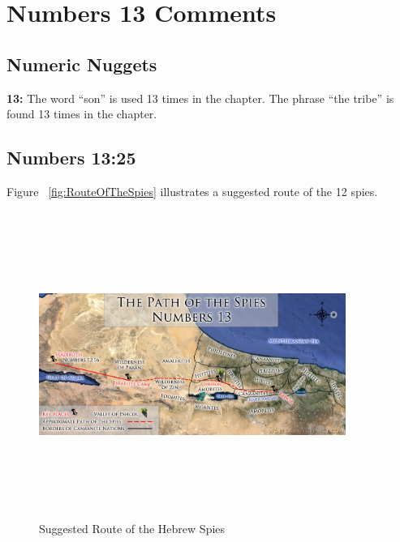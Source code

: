 \section{Numbers 13 Comments}

\subsection{Numeric Nuggets}
\textbf{13: } The word ``son'' is used 13 times in the chapter. The phrase ``the tribe'' is found 13 times in the chapter.

\subsection{Numbers 13:25}
Figure ~\ref{fig:RouteOfTheSpies} illustrates a suggested route of the 12 spies.

\begin{figure}[h]

\centering
\includegraphics[width=10cm, height=10cm]{Images/PathOfTheSpies.jpg}
\caption{Suggested Route of the Hebrew Spies}
\end{figure}
\label{fig:RouteOfTheSpies}